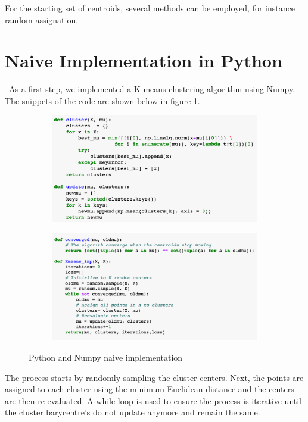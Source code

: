 \documentclass[11pt]{article}
\begin{document}
\noindent For the starting set of centroids, several methods can be employed, for instance random assignation.


\section*{Naive Implementation in Python}\
As a first step, we implemented a K-means clustering algorithm using Numpy. The snippets of the code are shown below in figure \ref{naive}.
	
		\begin{figure}[h!]
			\centering 
			\begin{subfigure}{0.7\textwidth}
				\includegraphics[width=\textwidth]{Figures/Imp1.png}
			\end{subfigure}
			\quad
			\begin{subfigure}{0.7\textwidth}
				\includegraphics[width=\textwidth]{Figures/Imp2.png}
			\end{subfigure} 
			\caption{Python and Numpy naive implementation}
			\label{naive}
		\end{figure}
\noindent The process starts by randomly sampling the cluster centers. Next, the points are assigned to each cluster using the minimum Euclidean distance and the centers are then re-evaluated. A while loop is used to ensure the process is iterative until the cluster barycentre's do not update anymore and remain the same.\\
\end{document}
